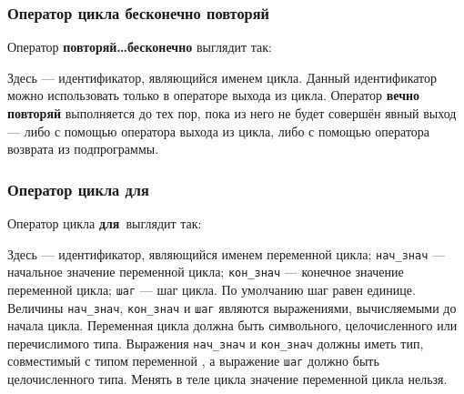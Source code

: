 \documentclass[10pt]{report}
\begin{document}
        \subsubsection{Оператор цикла \glqq бесконечно повторяй\grqq}
Оператор \textbf{\glqq повторяй\dots бесконечно\grqq} выглядит так:
\begin{center}
\textcolor{Green}{}
\end{center}
Здесь \textcolor{Green}{} --- идентификатор, являющийся именем цикла. Данный идентификатор можно использовать только в операторе выхода из цикла.
Оператор \textbf{\glqq вечно повторяй\grqq} выполняется до тех пор, пока из него не будет совершён явный выход --- либо с помощью оператора выхода из цикла, либо с
помощью оператора возврата из подпрограммы.
    
    

        \subsubsection{Оператор цикла \glqq для\grqq}
Оператор цикла \textbf{\glqq для\grqq}\ выглядит так:
\begin{center}
\textcolor{Green}{}
\end{center}

Здесь \textcolor{Green}{} --- идентификатор, являющийся именем переменной цикла; \texttt{нач_знач} --- начальное значение переменной цикла;
\texttt{кон_знач} --- конечное значение переменной цикла; \texttt{шаг} --- шаг цикла. По умолчанию шаг равен единице. Величины \texttt{нач_знач}, \texttt{кон_знач} и
\texttt{шаг} являются выражениями, вычисляемыми до начала цикла. Переменная цикла должна быть символьного, целочисленного или перечислимого типа. Выражения \texttt{нач_знач} и
\texttt{кон_знач} должны иметь тип, совместимый с типом переменной \textcolor{Green}{}, а выражение \texttt{шаг} должно быть целочисленного типа.
Менять в теле цикла значение переменной цикла нельзя.
\end{document}
